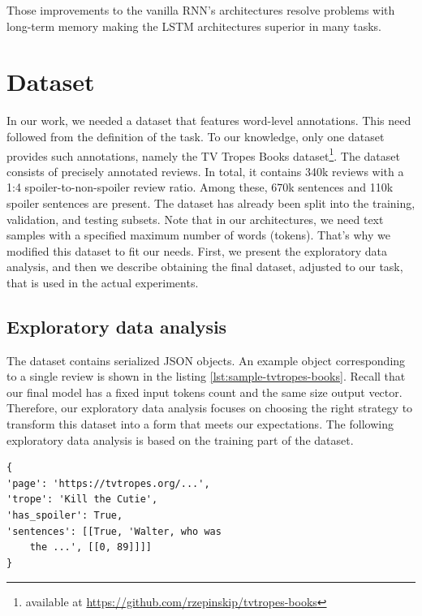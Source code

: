\documentclass[11pt]{article}
\begin{document}
Those improvements to the vanilla RNN's architectures resolve problems with long-term memory making the LSTM architectures superior in many tasks.

\section{Dataset} \label{dataset}
In our work, we needed a dataset that features word-level annotations. This need followed from the definition of the task. To our knowledge, only one dataset provides such annotations, namely the TV Tropes Books dataset\footnote{available at \url{https://github.com/rzepinskip/tvtropes-books}}. The dataset consists of precisely annotated reviews. In total, it contains 340k reviews with a 1:4 spoiler-to-non-spoiler review ratio. Among these, 670k sentences and 110k spoiler sentences are present. The dataset has already been split into the training, validation, and testing subsets. Note that in our architectures, we need text samples with a specified maximum number of words (tokens). That's why we modified this dataset to fit our needs. First, we present the exploratory data analysis, and then we describe obtaining the final dataset, adjusted to our task, that is used in the actual experiments.


\subsection{Exploratory data analysis} \label{eda}

The dataset contains serialized JSON objects. An example object corresponding to a single review is shown in the listing \ref{lst:sample-tvtropes-books}. Recall that our final model has a fixed input tokens count and the same size output vector. Therefore, our exploratory data analysis focuses on choosing the right strategy to transform this dataset into a form that meets our expectations. The following exploratory data analysis is based on the training part of the dataset.

\begin{minipage}{\linewidth}
\begin{lstlisting}[basicstyle=\small,caption={Sample truncated JSON object in the TV Tropes Books dataset. Each sentence contains a boolean flag that identifies spoiler sentences. In addition, annotated character indices provide specific spoiler boundaries.},label={lst:sample-tvtropes-books}]
{
'page': 'https://tvtropes.org/...',
'trope': 'Kill the Cutie',
'has_spoiler': True,
'sentences': [[True, 'Walter, who was
    the ...', [[0, 89]]]]
}
\end{lstlisting}
\end{minipage}
\end{document}
